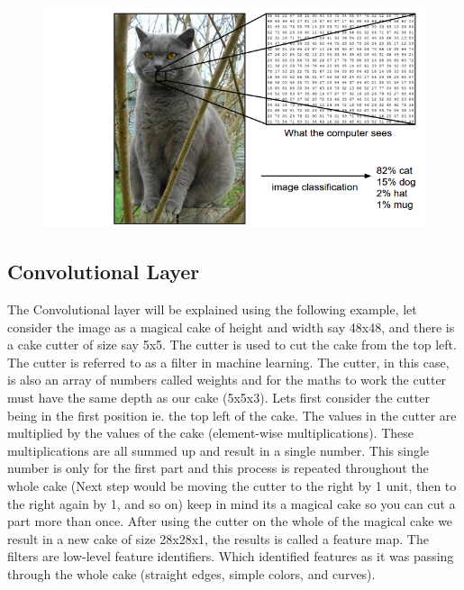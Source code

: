 \documentclass[12pt, a4paper,oneside]{report}
\begin{document}
\begin{figure}[htb!]
	\includegraphics [scale=0.5] {cat}
	\label{fig:cat}
\end{figure}

\subsection{Convolutional Layer}
The Convolutional layer will be explained using the following example, let consider the image as a magical cake of height and width say 48x48, and there is a cake cutter of size say 5x5. The cutter is used to cut the cake from the top left. The cutter is referred to as a filter in machine learning. The cutter, in this case, is also an array of numbers called weights and for the maths to work the cutter must have the same depth as our cake (5x5x3). Lets first consider the cutter being in the first position ie. the top left of the cake. The values in the cutter are multiplied by the values of the cake (element-wise multiplications). These multiplications are all summed up and result in a single number. This single number is only for the first part and this process is repeated throughout the whole cake (Next step would be moving the cutter to the right by 1 unit, then to the right again by 1, and so on) keep in mind its a magical cake so you can cut a part more than once. After using the cutter on the whole of the magical cake we result in a new cake of size 28x28x1, the results is called a feature map. The filters are low-level feature identifiers. Which identified features as it was passing through the whole cake (straight edges, simple colors, and curves). 
\end{document}
